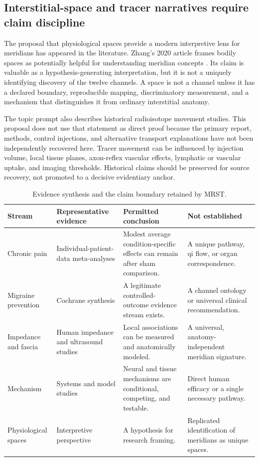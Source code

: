 \documentclass[conference]{IEEEtran}
\begin{document}
\subsection{Interstitial-space and tracer narratives require claim discipline}

The proposal that physiological spaces provide a modern interpretive lens for meridians has appeared in the literature. Zhang's 2020 article frames bodily spaces as potentially helpful for understanding meridian concepts \cite{zhang2020}. Its claim is valuable as a hypothesis-generating interpretation, but it is not a uniquely identifying discovery of the twelve channels. A space is not a channel unless it has a declared boundary, reproducible mapping, discriminatory measurement, and a mechanism that distinguishes it from ordinary interstitial anatomy.

The topic prompt also describes historical radioisotope movement studies. This proposal does not use that statement as direct proof because the primary report, methods, control injections, and alternative transport explanations have not been independently recovered here. Tracer movement can be influenced by injection volume, local tissue planes, axon-reflex vascular effects, lymphatic or vascular uptake, and imaging thresholds. Historical claims should be preserved for source recovery, not promoted to a decisive evidentiary anchor.

\begin{table}[!t]
\caption{Evidence synthesis and the claim boundary retained by MRST.}
\label{tab:evidence}
\centering
\footnotesize
\begin{tabular}{p{}|p{}|p{}|p{}}
\hline
\textbf{Stream} & \textbf{Representative evidence} & \textbf{Permitted conclusion} & \textbf{Not established} \\
\hline
Chronic pain & Individual-patient-data meta-analyses \cite{vickers2012,vickers2018} & Modest average condition-specific effects can remain after sham comparison. & A unique pathway, qi flow, or organ correspondence. \\
\hline
Migraine prevention & Cochrane synthesis \cite{linde2016} & A legitimate controlled-outcome evidence stream exists. & A channel ontology or universal clinical recommendation. \\
\hline
Impedance and fascia & Human impedance and ultrasound studies \cite{ahn2005,ahn2010,langevin2002} & Local associations can be measured and anatomically modeled. & A universal, anatomy-independent meridian signature. \\
\hline
Mechanism & Systems and model studies \cite{napadow2008,liu2021,chang2019} & Neural and tissue mechanisms are conditional, competing, and testable. & Direct human efficacy or a single necessary pathway. \\
\hline
Physiological spaces & Interpretive perspective \cite{zhang2020} & A hypothesis for research framing. & Replicated identification of meridians as unique spaces. \\
\hline
\end{tabular}
\end{table}
\end{document}
